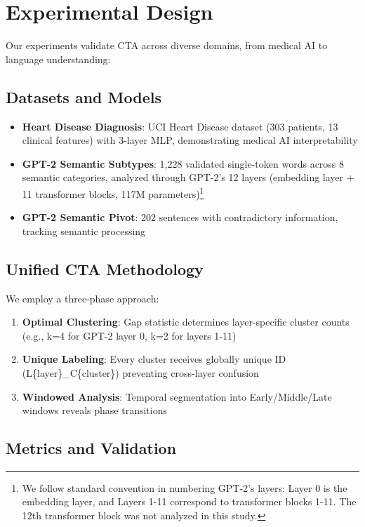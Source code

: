 \section{Experimental Design}

Our experiments validate CTA across diverse domains, from medical AI to language understanding:

\subsection{Datasets and Models}

\begin{itemize}
    \item \textbf{Heart Disease Diagnosis}: UCI Heart Disease dataset (303 patients, 13 clinical features) with 3-layer MLP, demonstrating medical AI interpretability
    \item \textbf{GPT-2 Semantic Subtypes}: 1,228 validated single-token words across 8 semantic categories, analyzed through GPT-2's 12 layers (embedding layer + 11 transformer blocks, 117M parameters)\footnote{We follow standard convention in numbering GPT-2's layers: Layer 0 is the embedding layer, and Layers 1-11 correspond to transformer blocks 1-11. The 12th transformer block was not analyzed in this study.}
    \item \textbf{GPT-2 Semantic Pivot}: 202 sentences with contradictory information, tracking semantic processing
\end{itemize}

\subsection{Unified CTA Methodology}

We employ a three-phase approach:

\begin{enumerate}
    \item \textbf{Optimal Clustering}: Gap statistic determines layer-specific cluster counts (e.g., k=4 for GPT-2 layer 0, k=2 for layers 1-11)
    \item \textbf{Unique Labeling}: Every cluster receives globally unique ID (L\{layer\}\_C\{cluster\}) preventing cross-layer confusion
    \item \textbf{Windowed Analysis}: Temporal segmentation into Early/Middle/Late windows reveals phase transitions
\end{enumerate}

\subsection{Metrics and Validation}

